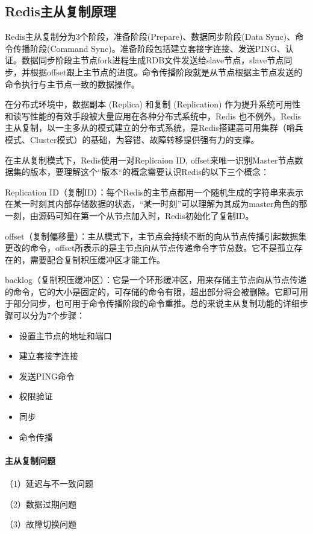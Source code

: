 \documentclass[../../../interview-questions.tex]{subfiles}
\begin{document}
\subsection{Redis主从复制原理}

Redis主从复制分为3个阶段，准备阶段(Prepare)、数据同步阶段(Data Sync)、命令传播阶段(Command Sync)。准备阶段包括建立套接字连接、发送PING、认证。数据同步阶段主节点fork进程生成RDB文件发送给slave节点，slave节点同步，并根据offset跟上主节点的进度。命令传播阶段就是从节点根据主节点发送的命令执行与主节点一致的数据操作。

在分布式环境中，数据副本 (Replica) 和复制 (Replication) 作为提升系统可用性和读写性能的有效手段被大量应用在各种分布式系统中，Redis 也不例外。Redis主从复制，以一主多从的模式建立的分布式系统，是Redis搭建高可用集群（哨兵模式、Cluster模式）的基础，为容错、故障转移提供强有力的支撑。

在主从复制模式下，Redis使用一对Replicaion ID, offset来唯一识别Master节点数据集的版本，要理解这个“版本“的概念需要认识Redis的以下三个概念：

Replication ID（复制ID）：每个Redis的主节点都用一个随机生成的字符串来表示在某一时刻其内部存储数据的状态，“某一时刻”可以理解为其成为master角色的那一刻，由源码可知在第一个从节点加入时，Redis初始化了复制ID。

offset（复制偏移量）：主从模式下，主节点会持续不断的向从节点传播引起数据集更改的命令，offset所表示的是主节点向从节点传递命令字节总数。它不是孤立存在的，需要配合复制积压缓冲区才能工作。

backlog（复制积压缓冲区）：它是一个环形缓冲区，用来存储主节点向从节点传递的命令，它的大小是固定的，可存储的命令有限，超出部分将会被删除。它即可用于部分同步，也可用于命令传播阶段的命令重推。总的来说主从复制功能的详细步骤可以分为7个步骤：

\begin{itemize}
    \item {设置主节点的地址和端口}
    \item {建立套接字连接}
    \item {发送PING命令}
    \item {权限验证}
    \item {同步}
    \item {命令传播}
\end{itemize}

\paragraph{主从复制问题}

（1）延迟与不一致问题

（2）数据过期问题

（3）故障切换问题
\end{document}
